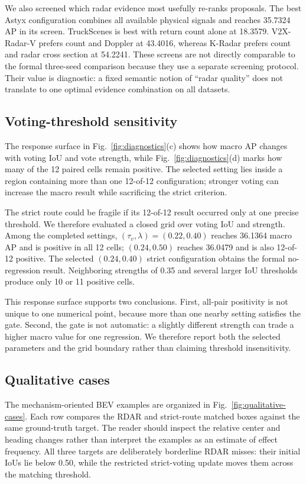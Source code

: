 \documentclass[final,5p,times]{elsarticle}
\newcommand{\figref}[1]{\textcolor{floatreviewblue}{Fig.~\ref{#1}}}
\newcommand{\figref}[1]{Fig.~\ref{#1}}
\begin{document}
We also screened which radar evidence most usefully re-ranks proposals. The
best Astyx configuration combines all available physical signals and reaches
35.7324 AP in its screen. TruckScenes is best with return count alone at
18.3579. V2X-Radar-V prefers count and Doppler at 43.4016, whereas K-Radar
prefers count and radar cross section at 54.2241. These screens are not
directly comparable to the formal three-seed comparison because they use a separate
screening protocol. Their value is diagnostic: a fixed semantic notion of
``radar quality'' does not translate to one optimal evidence combination on
all datasets.

\subsection{Voting-threshold sensitivity}

The response surface in \figref{fig:diagnostics}(c) shows how macro AP changes
with voting IoU and vote strength, while \figref{fig:diagnostics}(d) marks how
many of the 12 paired cells remain positive. The selected setting lies inside
a region containing more than one 12-of-12 configuration; stronger voting can
increase the macro result while sacrificing the strict criterion.

The strict route could be fragile if its 12-of-12 result occurred only at one
precise threshold. We therefore evaluated a closed grid over voting IoU and
strength. Among the completed settings, $(\tau_v,\lambda)=(0.22,0.40)$ reaches
36.1364 macro AP and is positive in all 12 cells; $(0.24,0.50)$ reaches
36.0479 and is also 12-of-12 positive. The selected $(0.24,0.40)$ strict
configuration obtains the formal no-regression result. Neighboring
strengths of 0.35 and several larger IoU thresholds produce only 10 or 11
positive cells.

This response surface supports two conclusions. First, all-pair positivity is
not unique to one numerical point, because more than one nearby setting
satisfies the gate. Second, the gate is not automatic: a slightly different
strength can trade a higher macro value for one regression. We therefore
report both the selected parameters and the grid boundary rather than claiming
threshold insensitivity.

\subsection{Qualitative cases}

The mechanism-oriented BEV examples are organized in
\figref{fig:qualitative-cases}. Each row compares the RDAR and strict-route
matched boxes against the same ground-truth target. The reader should inspect
the relative center and heading changes rather than interpret the examples as
an estimate of effect frequency. All three targets are deliberately
borderline RDAR misses: their initial IoUs lie below 0.50, while the restricted
strict-voting update moves them across the matching threshold.
\end{document}
